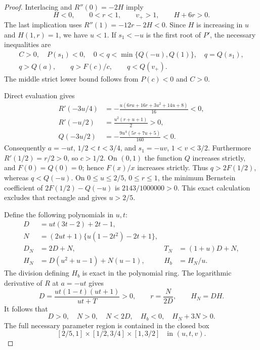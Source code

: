 \documentclass[11pt]{article}
\theoremstyle{definition}
\begin{document}
\begin{proof}
Interlacing and $R''(0)=-2H$ imply
\begin{equation}\label{eq:central-domain}
 H<0,\qquad 0<r<1,\qquad v_+>1,\qquad H+6r>0.
\end{equation}
The last implication uses $R''(1)=-12r-2H<0$.
Since $H$ is increasing in $u$ and $H(1,r)=1$, we have $u<1$.
If $s_1<-u$ is the first root of $P'$, the necessary inequalities are
\begin{equation}\label{eq:q-constraints}
 \begin{gathered}
 C>0,\quad P(s_1)<0,\quad 0<q<\min\{Q(-u),Q(1)\},\quad q=Q(s_1),\\
 q>Q(a),\qquad q>F(c)/c,\qquad q<Q(v_+).
 \end{gathered}
\end{equation}
The middle strict lower bound follows from $P(c)<0$ and $C>0$.

Direct evaluation gives
\begin{align}
 R'(-3u/4)&=-\frac{u(6ru+16r+3u^2+14u+8)}{16}<0,\\
 R'(-u/2)&=\frac{u^2(r+u+1)}{2}>0,\\
 Q(-3u/2)&=-\frac{9u^4(5r+7u+5)}{160}<0.
\end{align}
Consequently $a=-ut$, $1/2<t<3/4$, and $s_1=-uv$, $1<v<3/2$.
Furthermore $R'(1/2)=r/2>0$, so $c>1/2$. On $(0,1)$ the function $Q$
increases strictly, and $F(0)=Q(0)=0$; hence $F(x)/x$ increases strictly.
Thus $q>2F(1/2)$, whereas $q<Q(-u)$. On
$0\le u\le2/5$, $0\le r\le1$, the minimum Bernstein coefficient of
$2F(1/2)-Q(-u)$ is $2143/1000000>0$. This exact calculation excludes
that rectangle and gives $u>2/5$.

Define the following polynomials in $u,t$:
\begin{align}
 D&=ut(3t-2)+2t-1,\\
 N&=(2ut+1)\{u(1-2t^2)-2t+1\},\\
 D_N&=2D+N, &T_N&=(1+u)D+N,\\
 H_N&=D(u^2+u-1)+N(u-1), &H_b&=H_N/u.
\end{align}
The division defining $H_b$ is exact in the polynomial ring. The
logarithmic derivative of $R$ at $a=-ut$ gives
\begin{equation}
 D=\frac{ut(1-t)(ut+1)}{ut+T}>0,
 \qquad r=\frac{N}{2D},\qquad H_N=DH.
\end{equation}
It follows that
\begin{equation}\label{eq:necessary-D}
 D>0,\quad N>0,\quad N<2D,\quad H_b<0,\quad H_N+3N>0.
\end{equation}
The full necessary parameter region is contained in the closed box
\begin{equation}\label{eq:central-box}
 [2/5,1]\times[1/2,3/4]\times[1,3/2]
 \quad\text{in }(u,t,v).
\end{equation}


\end{proof}
\end{document}
